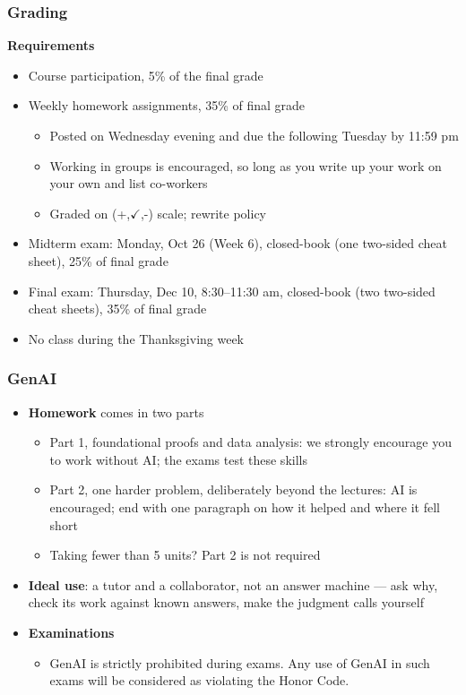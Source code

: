 \documentclass[xcolor=svgnames,9pt,english,aspectratio=169,t]{beamer}
\newif\ifrelease
\begin{document}
\begin{frame}
  \frametitle{Grading}
{\bf Requirements}
\bigskip
\begin{itemize}\itemsep0.8em
\item Course participation, 5\% of the final grade
\item Weekly homework assignments, 35\% of final grade
	\begin{itemize}
	\item \ifrelease Posted weekly and due six days later\else Posted on Wednesday evening and due the following Tuesday by 11:59 pm\fi
	\item Working in groups is encouraged, so long as you write up your work on your own and list co-workers
	\item Graded on (+,$\checkmark$,-) scale; rewrite policy
	\end{itemize}
\pause
\item Midterm exam\ifrelease{} (Week 6)\else: Monday, Oct 26 (Week 6)\fi, closed-book (one two-sided cheat sheet), 25\% of final grade
\pause
\item Final exam\ifrelease\else: Thursday, Dec 10, 8:30--11:30 am\fi, closed-book (two two-sided cheat sheets), 35\% of final grade
\ifrelease\else\item No class during the Thanksgiving week\fi
\end{itemize}
\end{frame}

\begin{frame}
  \frametitle{GenAI}
\begin{itemize}\itemsep1em
\item \textbf{Homework} comes in two parts
\begin{itemize}\itemsep0.5em
\item Part 1, foundational proofs and data analysis: we strongly encourage you to work without AI; the exams test these skills
\item Part 2, one harder problem, deliberately beyond the lectures: AI is encouraged; end with one paragraph on how it helped and where it fell short
\item Taking fewer than 5 units? Part 2 is not required
\end{itemize}
\item \textbf{Ideal use}: a tutor and a collaborator, not an answer machine --- ask why, check its work against known answers, make the judgment calls yourself
\item \textbf{Examinations}
\begin{itemize}\itemsep0.5em
\item GenAI is strictly prohibited during exams. Any use of GenAI in such exams will be considered as violating the Honor Code.
\end{itemize}
\end{itemize}
\end{frame}
\end{document}
